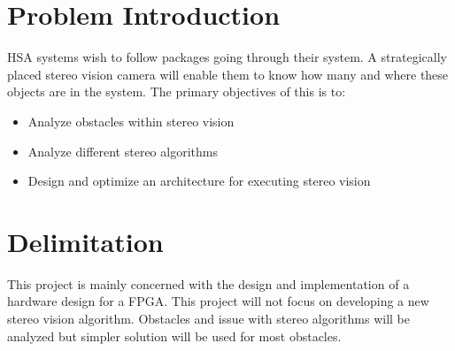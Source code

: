 \section{Problem Introduction}
HSA systems wish to follow packages going through their system. A strategically placed stereo vision camera will enable them to know how many and where these objects are in the system. 
The primary objectives of this is to:
\begin{itemize}
  \item Analyze obstacles within stereo vision
  \item Analyze different stereo algorithms
  \item Design and optimize an architecture for executing stereo vision 
\end{itemize}

\section{Delimitation}
This project is mainly concerned with the design and implementation of a hardware design for a FPGA. This project will not focus on developing a new stereo vision algorithm. Obstacles and issue with stereo algorithms will be analyzed but simpler solution will be used for most obstacles.

